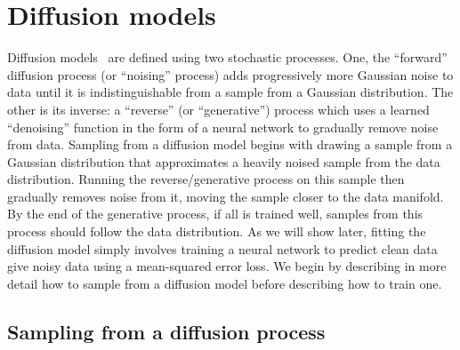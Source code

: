 \chapter{Diffusion models}
\label{ch:diffusion}

Diffusion models~\citep{sohl2015deep,ho2020denoising,nichol2021improved,song2020score} are defined using two stochastic processes. One, the ``forward'' diffusion process (or ``noising'' process) adds progressively more Gaussian noise to data until it is indistinguishable from a sample from a Gaussian distribution. The other is its inverse: a ``reverse'' (or ``generative'') process which uses a learned ``denoising'' function in the form of a neural network to gradually remove noise from data. Sampling from a diffusion model begins with drawing a sample from a Gaussian distribution that approximates a heavily noised sample from the data distribution. Running the reverse/generative process on this sample then gradually removes noise from it, moving the sample closer to the data manifold. By the end of the generative process, if all is trained well, samples from this process should follow the data distribution. As we will show later, fitting the diffusion model simply involves training a neural network to predict clean data give noisy data using a mean-squared error loss.  We begin by describing in more detail how to sample from a diffusion model before describing how to train one.

\section{Sampling from a diffusion process}

